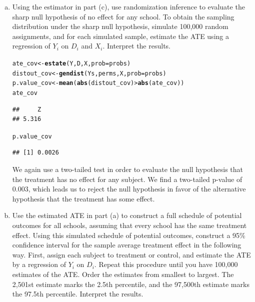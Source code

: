 \documentclass[11pt,notitlepage]{article}\usepackage[]{graphicx}\usepackage[]{color}
\makeatletter
\newcommand{\hlopt}[1]{\textcolor[rgb]{0,0,0}{#1}}%
\newcommand{\hlstd}[1]{\textcolor[rgb]{0.345,0.345,0.345}{#1}}%
\newcommand{\hlkwb}[1]{\textcolor[rgb]{0.69,0.353,0.396}{#1}}%
\newcommand{\hlkwc}[1]{\textcolor[rgb]{0.333,0.667,0.333}{#1}}%
\newcommand{\hlkwd}[1]{\textcolor[rgb]{0.737,0.353,0.396}{\textbf{#1}}}%
\newenvironment{kframe}{%
 \def\at@end@of@kframe{}%
 \ifinner\ifhmode%
  \def\at@end@of@kframe{\end{minipage}}%
  \begin{minipage}{\columnwidth}%
 \fi\fi%
 \def\FrameCommand##1{\hskip\@totalleftmargin \hskip-\fboxsep
 \colorbox{shadecolor}{##1}\hskip-\fboxsep
     \hskip-\linewidth \hskip-\@totalleftmargin \hskip\columnwidth}%
 \MakeFramed {\advance\hsize-\width
   \@totalleftmargin\z@ \linewidth\hsize
   \@setminipage}}%
 {\par\unskip\endMakeFramed%
 \at@end@of@kframe}
\newenvironment{knitrout}{}{} %
\makeatother
\begin{document}
\begin{enumerate}[a)]
\item Using the estimator in part (c), use randomization inference to evaluate the sharp null hypothesis of no effect for any school. To obtain the sampling distribution under the sharp null hypothesis, simulate 100,000 random assignments, and for each simulated sample, estimate the ATE using a regression of $Y_i$ on $D_i$ and $X_i$.  Interpret the results.

\begin{knitrout}
\color{fgcolor}\begin{kframe}
\begin{alltt}
\hlstd{ate_cov} \hlkwb{<-} \hlkwd{estate}\hlstd{(Y,D,X,}\hlkwc{prob}\hlstd{=probs)}
\hlstd{distout_cov} \hlkwb{<-} \hlkwd{gendist}\hlstd{(Ys,perms,X,}\hlkwc{prob}\hlstd{=probs)}
\hlstd{p.value_cov} \hlkwb{<-} \hlkwd{mean}\hlstd{(}\hlkwd{abs}\hlstd{(distout_cov)}\hlopt{>}\hlkwd{abs}\hlstd{(ate_cov))}
\hlstd{ate_cov}
\end{alltt}
\begin{verbatim}
##     Z 
## 5.316
\end{verbatim}
\begin{alltt}
\hlstd{p.value_cov}
\end{alltt}
\begin{verbatim}
## [1] 0.0026
\end{verbatim}
\end{kframe}
\end{knitrout}

We again use a two-tailed test in order to evaluate the null hypothesis that the treatment has no effect for any subject.  We find a two-tailed p-value of 0.003, which leads us to reject the null hypothesis in favor of the alternative hypothesis that the treatment has some effect.

\item Use the estimated ATE in part (a) to construct a full schedule of potential outcomes for all schools, assuming that every school has the same treatment effect. Using this simulated schedule of potential outcomes, construct a 95\% confidence interval for the sample average treatment effect in the following way. First, assign each subject to treatment or control, and estimate the ATE by a regression of $Y_i$ on $D_i$. Repeat this procedure until you have 100,000 estimates of the ATE.  Order the estimates from smallest to largest. The 2,501st estimate marks the 2.5th percentile, and the 97,500th estimate marks the 97.5th percentile. Interpret the results.


\end{enumerate}
\end{document}
